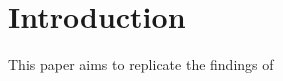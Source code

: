 \section{Introduction}
\label{sect:introduction}

This paper aims to replicate the findings of~\cite{Brunet2014a}
